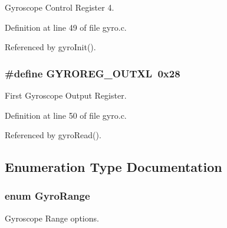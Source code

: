 Gyroscope Control Register 4. 



Definition at line 49 of file gyro.\-c.



Referenced by gyro\-Init().

\hypertarget{group__gyro_ga8840a0f1e53e6999ddf435a61c0dc279}{
\subsubsection[{G\-Y\-R\-O\-R\-E\-G\-\_\-\-O\-U\-T\-X\-L}]{\setlength{\rightskip}{0pt plus 5cm}\#define G\-Y\-R\-O\-R\-E\-G\-\_\-\-O\-U\-T\-X\-L~0x28}}\label{group__gyro_ga8840a0f1e53e6999ddf435a61c0dc279}


First Gyroscope Output Register. 



Definition at line 50 of file gyro.\-c.



Referenced by gyro\-Read().



\subsection{Enumeration Type Documentation}
\hypertarget{group__gyro_ga12b0e0572fdceaa90874f9364c862ead}{
\subsubsection[{Gyro\-Range}]{\setlength{\rightskip}{0pt plus 5cm}enum {\bf Gyro\-Range}}}\label{group__gyro_ga12b0e0572fdceaa90874f9364c862ead}


Gyroscope Range options. 

